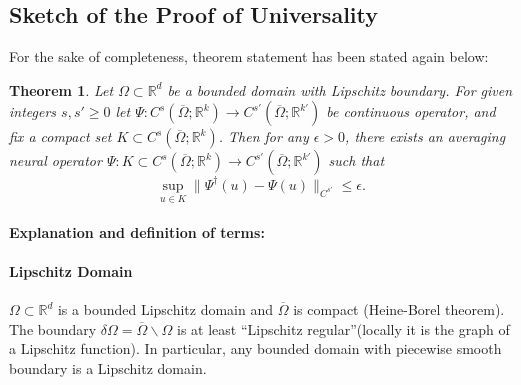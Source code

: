 \documentclass[reqno]{amsart}
\theoremstyle{plain}
\newtheorem{thm}{Theorem}
\theoremstyle{definition}
\newcommand{\bb}[1]{\mathbb{#1}}
\begin{document}
\subsection{Sketch of the Proof of Universality}
For the sake of completeness, theorem statement has been stated again below:
\begin{thm}
    Let $\Omega \subset \bb R^d$ be a bounded domain with Lipschitz boundary. For given integers $s,s' \geq 0$ let $\Psi : C^s(\overline{\Omega};\bb R^k) \to C^{s'}(\overline{\Omega};\bb R^{k'})$ be continuous operator, and fix a compact set $K \subset C^s(\overline{\Omega};\bb R^k)$. Then for any $\epsilon > 0$, there exists an averaging neural operator $\Psi : K \subset C^s(\overline{\Omega};\bb R^k) \to C^{s'}(\overline{\Omega};\bb R^{k'})$ such that 
    $$ \sup\limits_{u \in K}\|\Psi^\dag (u) - \Psi(u)\|_{C^{s'}} \leq \epsilon.$$ 
\end{thm}
\paragraph{\bf Explanation and definition of terms:}
\paragraph{\bf Lipschitz Domain}
$\Omega \subset \bb R^d$ is a bounded Lipschitz domain and $\overline{\Omega}$ is compact (Heine-Borel theorem). The boundary $\delta\Omega = \overline{\Omega}\backslash\Omega$ is at least ``Lipschitz regular''(locally it is the graph of a Lipschitz function). In particular, any bounded domain with piecewise smooth boundary is a Lipschitz domain.
\end{document}
